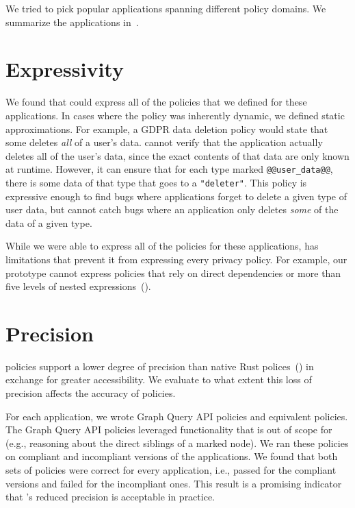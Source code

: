 We tried to pick popular applications spanning different policy domains.
%
We summarize the applications in~.

\section{Expressivity}
\label{sec:expressivity}
%
We found that \syslang{} could express all of the policies that we defined for these applications.
%
In cases where the policy was inherently dynamic, we defined static approximations.
%
For example, a GDPR data deletion policy would state that some \controller{} deletes \emph{all} of a user's data.
%
\sys{} cannot verify that the application actually deletes all of the user's data,
since the exact contents of that data are only known at runtime.
%
However, it can ensure that for each type marked \lstinline[language=CNL]|@@user_data@@|, 
there is some data of that type that goes to a \lstinline[language=CNL]|"deleter"|.
%
This policy is expressive enough to find bugs where applications forget to delete a given type of user data,
but cannot catch bugs where an application only deletes \emph{some} of the data of a given type.
%

While we were able to express all of the policies for these applications,
\syslang{} has limitations that prevent it from expressing every privacy policy.
%
For example, our \syslang{} prototype cannot express policies that rely on direct dependencies 
or more than five levels of nested expressions~().
%

\section{Precision}
\label{sec:precision}
\syslang{} policies support a lower degree of precision than native Rust polices~()
in exchange for greater accessibility.
%
We evaluate to what extent this loss of precision affects the accuracy of \syslang{} policies.

For each application, we wrote Graph Query API policies and equivalent \syslang{} policies.
%
The Graph Query API policies leveraged functionality that is out of scope for \syslang{}
(e.g., reasoning about the direct siblings of a marked node).
%
We ran these policies on compliant and incompliant versions of the applications.
%
We found that both sets of policies were correct for every application,
i.e., passed for the compliant versions and failed for the incompliant ones.
%
This result is a promising indicator that \syslang's reduced precision is acceptable in practice.

